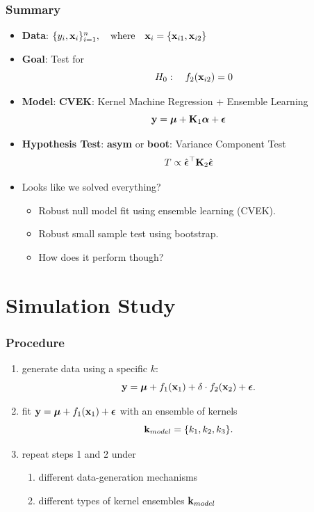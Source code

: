 \documentclass{beamer}
\begin{document}
\begin{frame}
\frametitle{Summary}
\begin{itemize}
\item \textbf{Data}: 
$\{ y_i, {\bf x}_i \}_{i=1}^n, \quad \mbox{where} \quad 
{\bf x}_i= \{{\bf x}_{i1}, {\bf x}_{i2}\}$
\item \textbf{Goal}: Test for $$\quad H_0: \quad f_2({\bf x}_{i2}) = 0$$
\item \textbf{Model}: {\color{red}\textbf{CVEK}}: Kernel Machine Regression + Ensemble Learning
$${\bf y} =\boldsymbol{\mu} + {\bf K}_1\boldsymbol{\alpha} +\boldsymbol{\epsilon}$$
\item \textbf{Hypothesis Test}: {\color{red}\textbf{asym} or \textbf{boot}}: Variance Component Test
$$ T \propto \hat{\boldsymbol{\epsilon}}^\top {\bf K}_2 \hat{\boldsymbol{\epsilon}}$$
\item Looks like we solved everything?
\begin{itemize}[<+->]
\item Robust null model fit using ensemble learning (CVEK).
\item Robust small sample test using bootstrap.
\item How does it perform though?
\end{itemize}
\end{itemize}
\end{frame}

\section{Simulation Study}
\begin{frame}  
\frametitle{Procedure}
\begin{enumerate}
\item generate data using a specific $k$: \[{\bf y}=\boldsymbol{\mu} + f_1({\bf x}_1)+\delta \cdot f_2({\bf x}_2) + \boldsymbol{\epsilon}.\]
\item fit ${\bf y}=\boldsymbol{\mu} + f_1({\bf x}_1) + \boldsymbol{\epsilon}$ with an ensemble of kernels $${\bf k}_{model}=\{k_1, k_2, k_3\}.$$
\item repeat steps 1 and 2 under
\begin{enumerate}
\item different data-generation mechanisms
\item different types of kernel ensembles ${\bf k}_{model}$
\end{enumerate}
\end{enumerate}
\end{frame}
\end{document}
